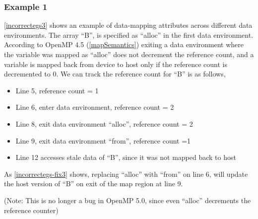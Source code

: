 \subsubsection{Example 1}
\autoref{incorrectegs3} shows an example of data-mapping 
attributes across different data environments.
The array ``B'', is specified as ``alloc'' in the first 
data environment. According to OpenMP 4.5 (\autoref{mapSemantics}) 
exiting a data environment where the variable was mapped as ``alloc'' does not decrement the reference count, and a variable is mapped 
back from device to host only if the reference count is decremented to 0. 
We can track the reference count for ``B'' is as follows, 
\begin{itemize}
 \item Line 5, reference count = 1
 \item Line 6, enter data environment, reference count = 2
 \item Line 8, exit data environment ``alloc'', reference count = 2
 \item Line 9, exit data environment ``from'', reference count =1
 \item Line 12 accesses stale data of ``B'', 
 since it was not mapped back to host
\end{itemize}
% 
As \autoref{incorrectegs-fix3} shows, replacing ``alloc'' 
with ``from'' on line 6, will update the host version of ``B'' 
on exit of the map region at line 9.

(Note: This is no longer a bug in OpenMP 5.0, since even ``alloc'' 
 decrements the reference counter)

